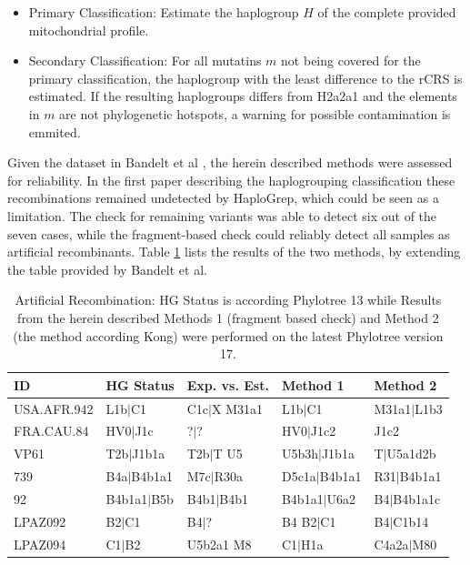 \begin{itemize}
	\item Primary Classification: Estimate the haplogroup $H$ of the complete provided mitochondrial profile. 
		\item Secondary Classification: For all mutatins $m$ not being covered for the primary classification, the haplogroup with the least difference to the rCRS is estimated. If the resulting haplogroups differs from H2a2a1 and the elements in $m$ are not phylogenetic hotspots, a warning for possible contamination is emmited.
\end{itemize}

Given the dataset in Bandelt et al \cite{Bandelt2012}, the herein described methods were assessed for reliability. In the first paper describing the haplogrouping classification these recombinations remained undetected by HaploGrep, which could be seen as a limitation. The check for remaining variants was able to detect six out of the seven cases, while the fragment-based check could reliably detect all samples as artificial recombinants. Table \ref{table:recomb} lists the results of the two methods, by extending the table provided by Bandelt et al. 


\begin{table}[H]
\centering
\label{table:recomb}
\begin{tabular}{lllll}
ID & HG Status & Exp. vs. Est. & Method 1 & Method 2\\ \midrule
USA.AFR.942 & L1b$|$C1 & C1c$|$X M31a1 & L1b$|$C1 &  M31a1$|$L1b3 \\
FRA.CAU.84 & HV0$|$J1c & ?$|$? & HV0$|$J1c2 & J1c2 \\
VP61 & T2b$|$J1b1a & T2b$|$T U5 & U5b3h$|$J1b1a & T$|$U5a1d2b \\
739 & B4a$|$B4b1a1 & M7c$|$R30a & D5c1a$|$B4b1a1 & R31$|$B4b1a1 \\
92 & B4b1a1$|$B5b & B4b1$|$B4b1& B4b1a1$|$U6a2 & B4$|$B4b1a1c \\
LPAZ092 & B2$|$C1 & B4$|$?& B4 B2$|$C1 & B4$|$C1b14 \\
LPAZ094 & C1$|$B2&U5b2a1 M8& C1$|$H1a & C4a2a$|$M80 
\end{tabular}
\caption{Artificial Recombination: HG Status is according Phylotree 13 while Results from the herein described Methods 1 (fragment based check) and Method 2 (the method according Kong) were performed on the latest Phylotree version 17.}
\end{table}

